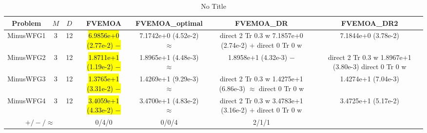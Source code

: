 \documentclass[journal]{IEEEtran}
\newcommand{\semitextbf}[1]{%
\pdfliteral direct {2 Tr 0.3 w} %
#1%
\pdfliteral direct {0 Tr 0 w}%
}
\begin{document}
\begin{table*}[htbp]
\renewcommand{\arraystretch}{1.2}
\centering
\caption{No Title}
\begin{tabular}{ccccccc}
\toprule
Problem&$M$&$D$&FVEMOA&FVEMOA\_optimal&FVEMOA\_DR&FVEMOA\_DR2\\
\midrule
\multirow{1}{*}{MinusWFG1}&3&12&\hl{6.9856e+0 (2.77e-2) $-$}&7.1742e+0 (4.52e-2) $\approx$&\semitextbf{7.1857e+0 (2.74e-2) $+$}&7.1844e+0 (3.78e-2)\\
\hline
\multirow{1}{*}{MinusWFG2}&3&12&\hl{1.8711e+1 (1.19e-2) $-$}&1.8965e+1 (4.48e-3) $\approx$&1.8958e+1 (4.32e-3) $-$&\semitextbf{1.8967e+1 (3.80e-3)}\\
\hline
\multirow{1}{*}{MinusWFG3}&3&12&\hl{1.3765e+1 (3.31e-2) $-$}&1.4269e+1 (9.29e-3) $\approx$&\semitextbf{1.4275e+1 (6.86e-3) $\approx$}&1.4274e+1 (7.04e-3)\\
\hline
\multirow{1}{*}{MinusWFG4}&3&12&\hl{3.4059e+1 (4.33e-2) $-$}&3.4700e+1 (4.83e-2) $\approx$&\semitextbf{3.4783e+1 (3.16e-2) $+$}&3.4725e+1 (5.17e-2)\\
\hline
\multicolumn{3}{c}{$+/-/\approx$}&0/4/0&0/0/4&2/1/1&\\
\bottomrule
\end{tabular}
\label{No Label}
\end{table*}
\end{document}
